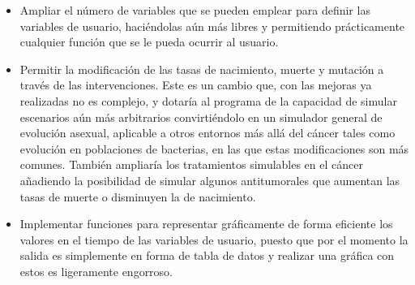 \begin{itemize}
	\item Ampliar el número de variables que se pueden emplear para definir las variables de usuario, haciéndolas aún más libres y permitiendo prácticamente cualquier función que se le pueda ocurrir al usuario.
	\item Permitir la modificación de las tasas de nacimiento, muerte y mutación a través de las intervenciones. Este es un cambio que, con las mejoras ya realizadas no es complejo, y dotaría al programa de la capacidad de simular escenarios aún más arbitrarios convirtiéndolo en un simulador general de evolución asexual, aplicable a otros entornos más allá del cáncer tales como evolución en poblaciones de bacterias, en las que estas modificaciones son más comunes. También ampliaría los tratamientos simulables en el cáncer añadiendo la posibilidad de simular algunos antitumorales que aumentan las tasas de muerte o disminuyen la de nacimiento.
	\item Implementar funciones para representar gráficamente de forma eficiente los valores en el tiempo de las variables de usuario, puesto que por el momento la salida es simplemente en forma de tabla de datos y realizar una gráfica con estos es ligeramente engorroso.
\end{itemize}